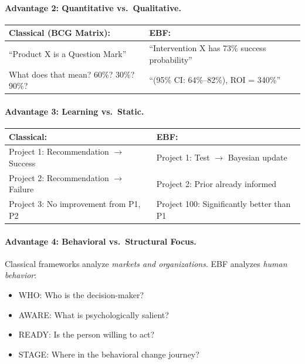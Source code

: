 \paragraph{Advantage 2: Quantitative vs.\ Qualitative.}

\begin{center}
\begin{tabular}{@{}p{6.5cm}p{6.5cm}@{}}
\textbf{Classical (BCG Matrix):} & \textbf{EBF:} \\
\midrule
``Product X is a Question Mark'' & ``Intervention X has 73\% success probability'' \\
What does that mean? 60\%? 30\%? 90\%? & ``(95\% CI: 64\%--82\%), ROI = 340\%'' \\
\end{tabular}
\end{center}

\paragraph{Advantage 3: Learning vs.\ Static.}

\begin{center}
\begin{tabular}{@{}p{6.5cm}p{6.5cm}@{}}
\textbf{Classical:} & \textbf{EBF:} \\
\midrule
Project 1: Recommendation $\rightarrow$ Success & Project 1: Test $\rightarrow$ Bayesian update \\
Project 2: Recommendation $\rightarrow$ Failure & Project 2: Prior already informed \\
Project 3: No improvement from P1, P2 & Project 100: Significantly better than P1 \\
\end{tabular}
\end{center}

\paragraph{Advantage 4: Behavioral vs.\ Structural Focus.}

Classical frameworks analyze \textit{markets and organizations}. EBF analyzes \textit{human behavior}:
\begin{itemize}[nosep]
    \item WHO: Who is the decision-maker?
    \item AWARE: What is psychologically salient?
    \item READY: Is the person willing to act?
    \item STAGE: Where in the behavioral change journey?
\end{itemize}

